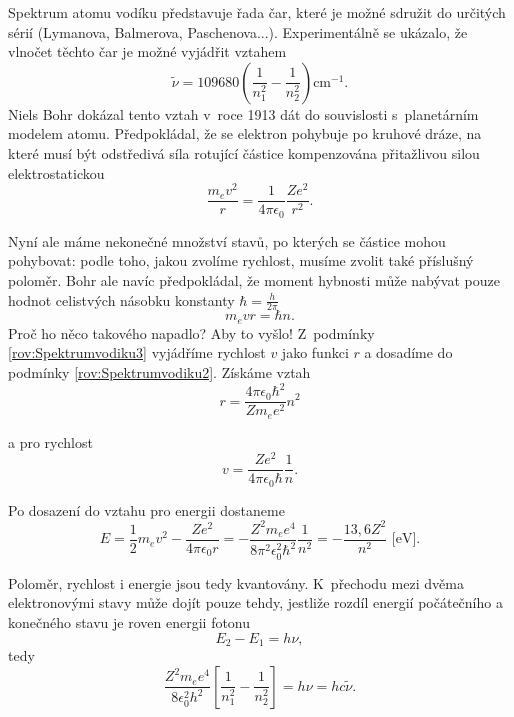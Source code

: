 Spektrum atomu vodíku představuje řada čar, které je možné sdružit do určitých sérií (Lymanova, Balmerova, Paschenova...). Experimentálně se ukázalo, že vlnočet těchto čar je možné vyjádřit vztahem
\begin{equation}
\tilde{\nu} = 109680\left( \frac{1}{n_1^2} - \frac{1}{n_2^2}\right ) \mathrm{cm} ^{-1}\mbox{.}
\label{rov:Spektrumvodiku1}
\end{equation}
Niels Bohr dokázal tento vztah v~roce 1913 dát do souvislosti s~planetárním modelem atomu. Předpokládal, že se elektron pohybuje po kruhové dráze, na které musí být odstředivá síla rotující částice kompenzována přitažlivou silou elektrostatickou
\begin{equation}
\frac{m_{e}v^2}{r} = \frac{1}{4\pi \epsilon_0}\frac{Ze^2}{r^2}\mbox{.}
\label{rov:Spektrumvodiku2}
\end{equation}

\noindent Nyní ale máme nekonečné množství stavů, po kterých se částice mohou pohybovat: podle toho, jakou zvolíme rychlost, musíme zvolit také příslušný poloměr. Bohr ale navíc předpokládal, že moment hybnosti může nabývat pouze hodnot celistvých násobku konstanty $\hbar=\frac{h}{2\pi}$
\begin{equation}
m_{e}vr = \hbar n \mbox{.}
\label{rov:Spektrumvodiku3}
\end{equation}
\noindent Proč ho něco takového napadlo? Aby to vyšlo! Z~podmínky \ref{rov:Spektrumvodiku3} vyjádříme rychlost $v$ jako funkci $r$ a dosadíme do podmínky \ref{rov:Spektrumvodiku2}. Získáme vztah
\begin{equation}
r = \frac{4\pi\epsilon_0\hbar^2}{Zm_e e^2}n^2
\label{rov:Spektrumvodiku4}
\end{equation}

\noindent a pro rychlost
\begin{equation}
v = \frac{Ze^2}{4\pi\epsilon_0\hbar}\frac{1}{n}\mbox{.}
\label{rov:Spektrumvodiku5}
\end{equation}

\noindent Po dosazení do vztahu pro energii dostaneme
\begin{equation}
\boxed{E = \frac{1}{2}m_e v^2 - \frac{Ze^2}{4\pi\epsilon_0r} = - \frac{Z^2m_e e^4}{8 \pi^2 \epsilon_0^2\hbar^2}\frac{1}{n^2} = -\frac{13,6 Z^2}{n^2} \mbox{ [eV]}\mbox{.}}
\label{Spektrumvodiku6}
\end{equation}

\noindent Poloměr, rychlost i energie jsou tedy kvantovány. K~přechodu mezi dvěma elektronovými stavy může dojít pouze tehdy, jestliže rozdíl energií počátečního a konečného stavu je roven energii fotonu
\begin{equation}
E_2-E_1 = h\nu,
\label{rov:Spektrumvodiku7}
\end{equation}
tedy
\begin{equation}
\frac{Z^2m_e e^4}{8\epsilon_0^2h^2}\left[ \frac{1}{n_1^2} - \frac{1}{n_2^2} \right ] = h\nu = hc\tilde{\nu}.
\label{rov:Spektrumvodiku8}
\end{equation}

